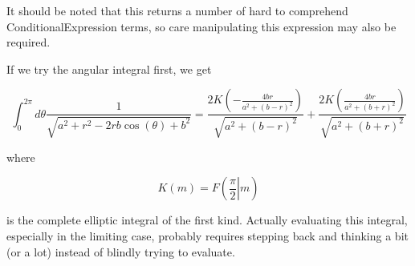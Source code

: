 It should be noted that this returns a number of hard to comprehend ConditionalExpression terms, so care manipulating this expression may also be required.

If we try the angular integral first, we get

\begin{equation}\label{eqn:cylinderPotential:130}
\int_0^{2 \pi } 
d\theta
\frac{1}{\sqrt{a^2+r^2-2 r b \cos (\theta )+b^2}} 
=
\frac{2 K\left(-\frac{4 b r}{a^2+(b-r)^2}\right)}{\sqrt{a^2+(b-r)^2}}+\frac{2 K\left(\frac{4 b r}{a^2+(b+r)^2}\right)}{\sqrt{a^2+(b+r)^2}}
\end{equation}

where

\begin{equation}\label{eqn:cylinderPotential:150}
K(m) = F\left( \left.\frac{\pi }{2}\right| m \right)
\end{equation}

is the complete elliptic integral of the first kind.  Actually evaluating this integral, especially in the limiting case, probably requires stepping back and thinking a bit (or a lot) instead of blindly trying to evaluate.

\EndArticle
